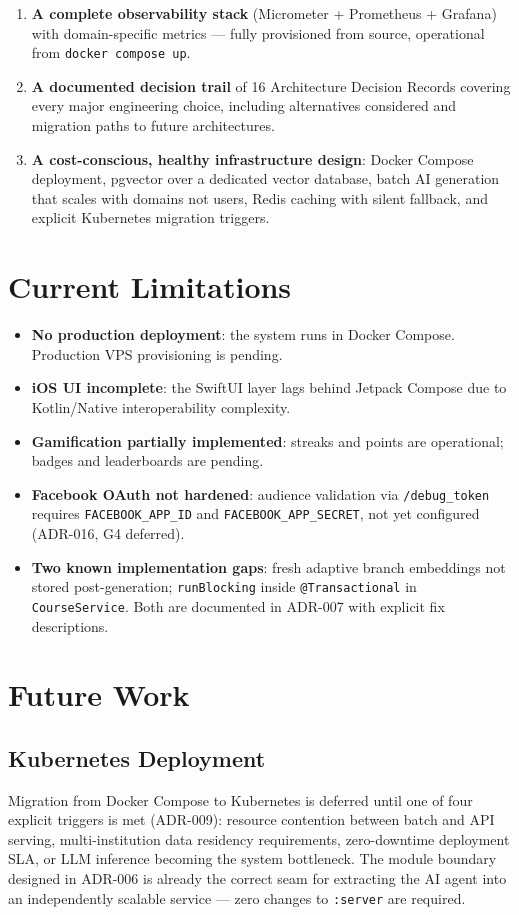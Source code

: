 \begin{enumerate}
    \item \textbf{A complete observability stack} (Micrometer + Prometheus + Grafana) with domain-specific metrics — fully provisioned from source, operational from \texttt{docker compose up}.
    \item \textbf{A documented decision trail} of 16 Architecture Decision Records covering every major engineering choice, including alternatives considered and migration paths to future architectures.
    \item \textbf{A cost-conscious, healthy infrastructure design}: Docker Compose deployment, pgvector over a dedicated vector database, batch AI generation that scales with domains not users, Redis caching with silent fallback, and explicit Kubernetes migration triggers.
\end{enumerate}

\section{Current Limitations}
\label{sec:limitations}

\begin{itemize}
    \item \textbf{No production deployment}: the system runs in Docker Compose. Production VPS provisioning is pending.
    \item \textbf{iOS UI incomplete}: the SwiftUI layer lags behind Jetpack Compose due to Kotlin/Native interoperability complexity.
    \item \textbf{Gamification partially implemented}: streaks and points are operational; badges and leaderboards are pending.
    \item \textbf{Facebook OAuth not hardened}: audience validation via \texttt{/debug\_token} requires \texttt{FACEBOOK\_APP\_ID} and \texttt{FACEBOOK\_APP\_SECRET}, not yet configured (ADR-016, G4 deferred).
    \item \textbf{Two known implementation gaps}: fresh adaptive branch embeddings not stored post-generation; \texttt{runBlocking} inside \texttt{@Transactional} in \texttt{CourseService}. Both are documented in ADR-007 with explicit fix descriptions.
\end{itemize}

\section{Future Work}
\label{sec:future}

\subsection{Kubernetes Deployment}
Migration from Docker Compose to Kubernetes is deferred until one of four explicit triggers is met (ADR-009): resource contention between batch and API serving, multi-institution data residency requirements, zero-downtime deployment SLA, or LLM inference becoming the system bottleneck. The module boundary designed in ADR-006 is already the correct seam for extracting the AI agent into an independently scalable service — zero changes to \texttt{:server} are required.

